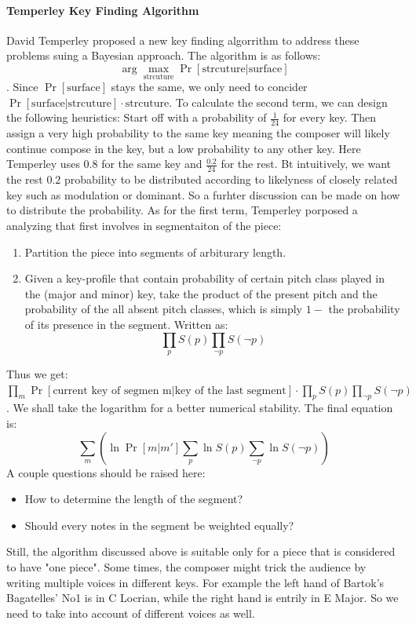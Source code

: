 \documentclass[12pt]{report}
\theoremstyle{definition}
\begin{document}
\paragraph*{Temperley Key Finding Algorithm}
David Temperley proposed a new key finding algorrithm to address these problems suing a 
Bayesian approach. The algorithm is as follows:
\[\arg \max_{\text{strcuture}}\Pr[\text{strcuture|surface}]\]. 
Since $\Pr[\text{surface}]$ stays the same, we only need to concider
$\Pr[\text{surface|strcuture}]\cdot\text{strcuture}$. To calculate 
the second term, we can design the following heuristics:
Start off with a probability of $\frac{1}{24}$ for every key. Then assign a 
very high probability to the same key meaning the composer will likely continue
compose in the key, but a low probability to any other key. Here Temperley uses
$0.8$ for the same key and $\frac{0.2}{24}$ for the rest. Bt intuitively, we want the rest
$0.2$ probability to be distributed according to likelyness of closely related key 
such as modulation or dominant. So a furhter discussion can be 
made on how to distribute the probability. As for the first term, Temperley porposed
a analyzing that first involves in segmentaiton of the piece:
\begin{enumerate}
    \item Partition the piece into segments of arbiturary length.
    \item Given a key-profile that contain probability of certain pitch class 
    played in the (major and minor) key, take the product of the present pitch 
    and the probability of the all absent pitch classes, which is 
    simply $1-$ the probability of its presence in the segment. Written as:
    \[\prod_p S(p)\prod_{\neg p}S(\neg p) \]
\end{enumerate}
Thus we get:
$\prod_m \Pr[\text{current key of segmen m}|\text{key of the last segment}]
\cdot\prod_p S(p)\prod_{\neg p}S(\neg p)$. We shall 
take the logarithm for a better numerical stability. The final equation is:
\[\sum_m (\ln\Pr[m|m']\sum_p\ln S(p)\sum_{\neg p}\ln S(\neg p))\]
A couple questions should be raised here:
\begin{itemize}
    \item How to determine the length of the segment?
    \item Should every notes in the segment be weighted equally?
\end{itemize}
Still, the algorithm discussed above is suitable only for a piece that is 
considered to have "one piece". Some times, the composer might trick the 
audience by writing multiple voices in different keys. For example
the left hand of Bartok's Bagatelles' No1 is in C Locrian, while the right hand is 
entrily in E Major. So we need to take into account of different voices as well. 
\end{document}
